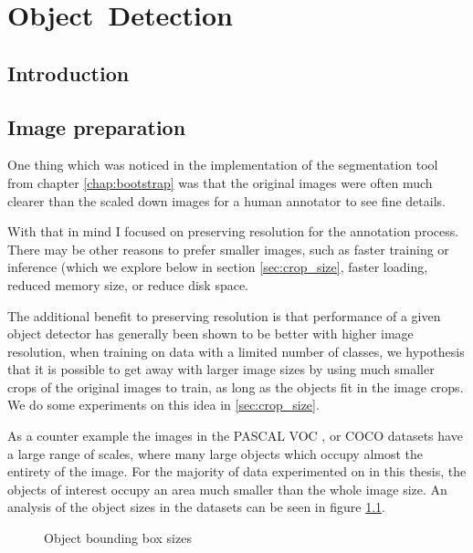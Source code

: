 \chapter{Object~Detection}
\label{chap:object_detection} 


\section{Introduction}


\section {Image preparation}

One thing which was noticed in the implementation of the segmentation tool from chapter \ref{chap:bootstrap} was that the original images were often much clearer than the scaled down images for a human annotator to see fine details.

With that in mind I focused on preserving resolution for the annotation process. There may be other reasons to prefer smaller images, such as faster training or inference (which we explore below in section \ref{sec:crop_size}, faster loading, reduced memory size, or reduce disk space. 

The additional benefit to preserving resolution is that performance of a given object detector has generally been shown to be better with higher image resolution, when training on data with a limited number of classes, we hypothesis that it is possible to get away with larger image sizes by using much smaller crops of the original images to train, as long as the objects fit in the image crops. We do some experiments on this idea in \ref{sec:crop_size}.

As a counter example the images in the PASCAL VOC \cite{Everingham2008}, or COCO\cite{Lin2014} datasets have a large range of scales, where many large objects which occupy almost the entirety of the image. For the majority of data experimented on in this thesis, the objects of interest occupy an area much smaller than the whole image size. An analysis of the object sizes in the datasets can be seen in figure \ref{fig:box_sizes}.



\begin{figure}[ht]
\centering

\caption{Object bounding box sizes}
\label{fig:box_sizes}
\end{figure}


